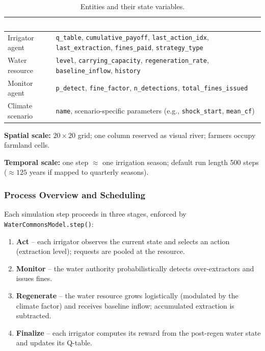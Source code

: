 \documentclass[12pt, a4paper]{article}
\begin{document}
\begin{table}[H]
    \centering
    \renewcommand{\arraystretch}{1.3}
    \small
    \begin{tabular}{|l|p{10.5cm}|}
        \hline
        \rowcolor{nutDark}
        \textcolor{white}{\textbf{Entity}} & \textcolor{white}{\textbf{State variables}} \\ \hline
        Irrigator agent & \texttt{q\_table}, \texttt{cumulative\_payoff}, \texttt{last\_action\_idx},
                          \texttt{last\_extraction}, \texttt{fines\_paid}, \texttt{strategy\_type} \\ \hline
        Water resource & \texttt{level}, \texttt{carrying\_capacity}, \texttt{regeneration\_rate},
                         \texttt{baseline\_inflow}, \texttt{history} \\ \hline
        Monitor agent & \texttt{p\_detect}, \texttt{fine\_factor}, \texttt{n\_detections},
                        \texttt{total\_fines\_issued} \\ \hline
        Climate scenario & \texttt{name}, scenario-specific parameters (e.g., \texttt{shock\_start}, \texttt{mean\_cf}) \\ \hline
    \end{tabular}
    \caption{Entities and their state variables.}
\end{table}

\noindent\textbf{Spatial scale:} $20 \times 20$ grid; one column reserved as
visual river; farmers occupy farmland cells.

\noindent\textbf{Temporal scale:} one step $\approx$ one irrigation season;
default run length 500 steps ($\approx 125$ years if mapped to quarterly seasons).

\subsubsection{Process Overview and Scheduling}

Each simulation step proceeds in three stages, enforced by
\texttt{WaterCommonsModel.step()}:

\begin{enumerate}[label=\textbf{Stage \arabic*.}, leftmargin=*]
    \item \textbf{Act} -- each irrigator observes the current state and selects
    an action (extraction level); requests are pooled at the resource.
    \item \textbf{Monitor} -- the water authority probabilistically detects
    over-extractors and issues fines.
    \item \textbf{Regenerate} -- the water resource grows logistically (modulated
    by the climate factor) and receives baseline inflow; accumulated extraction
    is subtracted.
    \item \textbf{Finalize} -- each irrigator computes its reward from the
    post-regen water state and updates its Q-table.
\end{enumerate}
\end{document}
